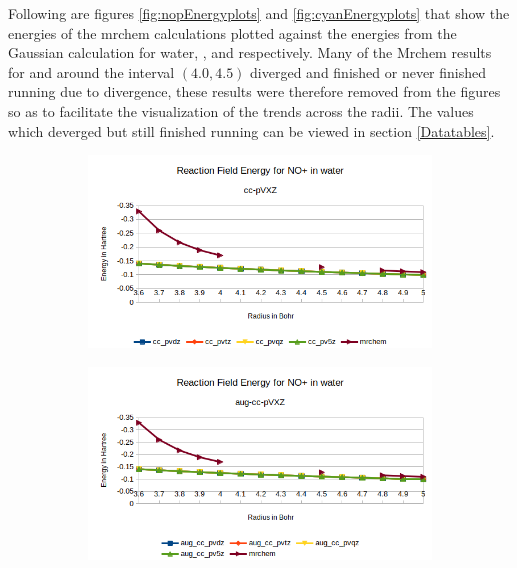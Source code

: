 \documentclass[../master_thesis.tex]{subfiles}
\begin{document}
Following are figures \ref{fig:nopEnergyplots} and \ref{fig:cyanEnergyplots}
that show the energies of the mrchem calculations plotted
against the energies from the Gaussian calculation for water, , and
 respectively. Many of the Mrchem results for  and 
around the interval $(4.0, 4.5)$ diverged and finished or never finished
running due to divergence,  these results were therefore removed from the figures so as to facilitate
the visualization of the trends across the radii. The values which deverged but still
finished running can be viewed in section \ref{Datatables}.



\begin{figure}[h!]
  \centering
  \begin{subfigure}[b]{0.75\linewidth}
    \includegraphics[width=\linewidth]{img/Ernop.png}
  \end{subfigure}
  \begin{subfigure}[b]{0.75\linewidth}
    \includegraphics[width=\linewidth]{img/Eraugnop.png}
  \end{subfigure}
  \begin{subfigure}[b]{0.75\linewidth}

\end{subfigure}
\end{figure}
\end{document}
